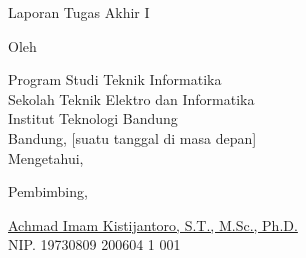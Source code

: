 \clearpage
\pagestyle{empty}

\begin{center}
    \smallskip
    
    \Large \bfseries \MakeUppercase{\thetitle}
    \vfill
    
    \Large Laporan Tugas Akhir I
    \vfill
    
    \large Oleh
    
    \Large \theauthor
    
    \large Program Studi Teknik Informatika \\
    
    \normalsize \normalfont
    Sekolah Teknik Elektro dan Informatika \\
    Institut Teknologi Bandung \\
    
    \vfill
    \normalsize \normalfont
    Bandung, [suatu tanggal di masa depan] \\
    Mengetahui,
    
    \vspace{0.5cm}
    Pembimbing,
    
    \vfill
    \underline{Achmad Imam Kistijantoro, S.T., M.Sc., Ph.D.} \\
    NIP. 19730809 200604 1 001
    
\end{center}
\clearpage
